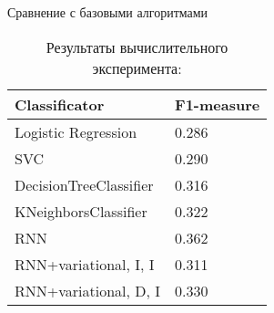 \documentclass{beamer}
\begin{document}
\begin{frame}{Сравнение с базовыми алгоритмами}



\vspace{-0.5cm}

\begin{table}[H]
	\centering
	\caption*{Результаты вычислительного эксперимента:}
	\label{my-label1}
	\begin{tabular}{|l|l|}
		\hline
		Classificator          & F1-measure \\ \hline
		Logistic Regression    & 0.286      \\ \hline
		SVC                    & 0.290      \\ \hline
		DecisionTreeClassifier & 0.316      \\ \hline
		KNeighborsClassifier   & 0.322      \\ \hline
		RNN                    & 0.362      \\ \hline
		RNN+variational, I, I  & 0.311      \\ \hline
		RNN+variational, D, I  & 0.330      \\ \hline
	\end{tabular}
\end{table}

\end{frame}

%
%
%

%
%
%
%
\end{document}
